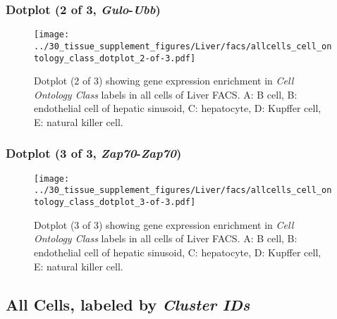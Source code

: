 \clearpage

\subsubsection{Dotplot (2 of 3, \emph{Gulo}-\emph{Ubb})}
\begin{figure}[h]
\centering
\texttt{[image: ../30\_tissue\_supplement\_figures/Liver/facs/allcells\_cell\_ontology\_class\_dotplot\_2-of-3.pdf]}

\caption{ Dotplot (2 of 3)  showing gene expression enrichment in \emph{Cell Ontology Class} labels in all cells of Liver FACS. A: B cell, B: endothelial cell of hepatic sinusoid, C: hepatocyte, D: Kupffer cell, E: natural killer cell.}
\end{figure}


\clearpage

\subsubsection{Dotplot (3 of 3, \emph{Zap70}-\emph{Zap70})}
\begin{figure}[h]
\centering
\texttt{[image: ../30\_tissue\_supplement\_figures/Liver/facs/allcells\_cell\_ontology\_class\_dotplot\_3-of-3.pdf]}

\caption{ Dotplot (3 of 3)  showing gene expression enrichment in \emph{Cell Ontology Class} labels in all cells of Liver FACS. A: B cell, B: endothelial cell of hepatic sinusoid, C: hepatocyte, D: Kupffer cell, E: natural killer cell.}
\end{figure}


\clearpage

\subsection{All Cells, labeled by \emph{Cluster IDs}}
